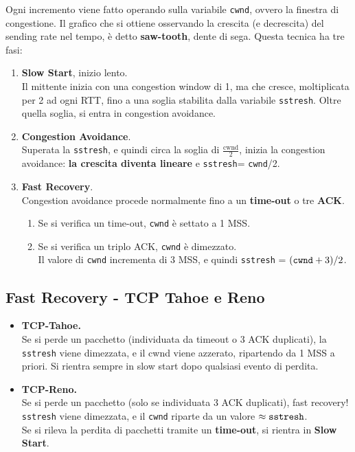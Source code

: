 Ogni incremento viene fatto operando sulla variabile \verb|cwnd|, ovvero la finestra di congestione. 
Il grafico che si ottiene osservando la crescita (e decrescita) del sending rate nel tempo, è detto \textbf{saw-tooth}, dente di sega. Questa tecnica ha tre fasi:
\begin{enumerate}
	\item \textbf{Slow Start}, inizio lento.\\
	Il mittente inizia con una congestion window di 1, ma che cresce, moltiplicata per 2 ad ogni RTT, fino a una soglia stabilita dalla variabile \verb|sstresh|. Oltre quella soglia, si entra in congestion avoidance.
	
	\item \textbf{Congestion Avoidance}.\\
	Superata la \verb|sstresh|, e quindi circa la soglia di $\frac{\text{cwnd}}{2}$, inizia la congestion avoidance: \textbf{la crescita diventa lineare} e \verb|sstresh|= \verb|cwnd|/2.
	\item \textbf{Fast Recovery}.\\
	Congestion avoidance procede normalmente fino a un \textbf{time-out} o tre \textbf{ACK}.
	
	\begin{enumerate}
		\item Se si verifica un time-out, \verb|cwnd| è settato a 1 MSS. 
		\item Se si verifica un triplo ACK, \verb|cwnd| è dimezzato.\\
		Il valore di \verb|cwnd| incrementa di 3 MSS, e quindi \verb|sstresh| = $(\verb|cwnd|+3)/2$.
	\end{enumerate}
	
	
\end{enumerate}


\subsection{Fast Recovery - TCP Tahoe e Reno}

\begin{itemize}
	\item \textbf{TCP-Tahoe.}\\
	Se si perde un pacchetto (individuata da timeout o 3 ACK duplicati), la \verb|sstresh| viene dimezzata, e il cwnd viene azzerato, ripartendo da 1 MSS a priori. Si rientra sempre in slow start dopo qualsiasi evento di perdita.
	\item \textbf{TCP-Reno.}\\
	Se si perde un pacchetto (solo se individuata 3 ACK duplicati), fast recovery! \verb|sstresh| viene dimezzata, e il \verb|cwnd| riparte da un valore $\approx \verb|sstresh|$.\\
	Se si rileva la perdita di pacchetti tramite un \textbf{time-out}, si rientra in \textbf{Slow Start}.
\end{itemize}

